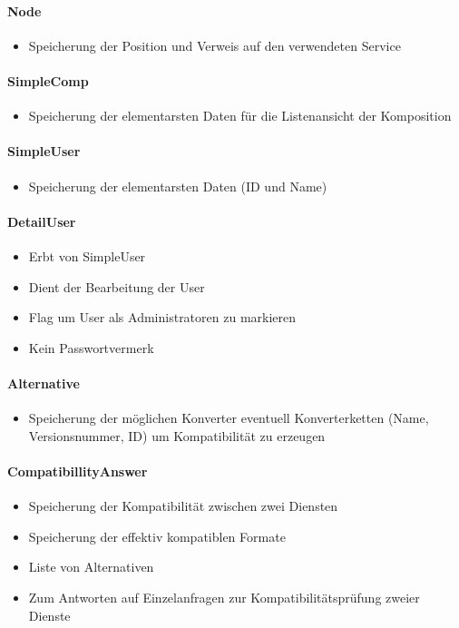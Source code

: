 \paragraph{Node} 
\begin{itemize}
	\item Speicherung der Position und Verweis auf den verwendeten Service
\end{itemize}
\paragraph{SimpleComp}
\begin{itemize}
	\item Speicherung der elementarsten Daten für die Listenansicht der Komposition
\end{itemize}
\paragraph{SimpleUser}
\begin{itemize}
	\item Speicherung der elementarsten Daten (ID und Name)
\end{itemize}
\paragraph{DetailUser}
\begin{itemize}
	\item Erbt von SimpleUser
	\item Dient der Bearbeitung der User
	\item Flag um User als Administratoren zu markieren
	\item Kein Passwortvermerk
\end{itemize}
\paragraph{Alternative}
\begin{itemize}
	\item Speicherung der möglichen Konverter eventuell Konverterketten (Name, Versionsnummer, ID) um Kompatibilität zu erzeugen
\end{itemize}
\paragraph{CompatibillityAnswer}
\begin{itemize}
	\item Speicherung der Kompatibilität zwischen zwei Diensten
	\item Speicherung der effektiv kompatiblen Formate
	\item Liste von Alternativen
	\item Zum Antworten auf Einzelanfragen zur Kompatibilitätsprüfung zweier Dienste
\end{itemize}
